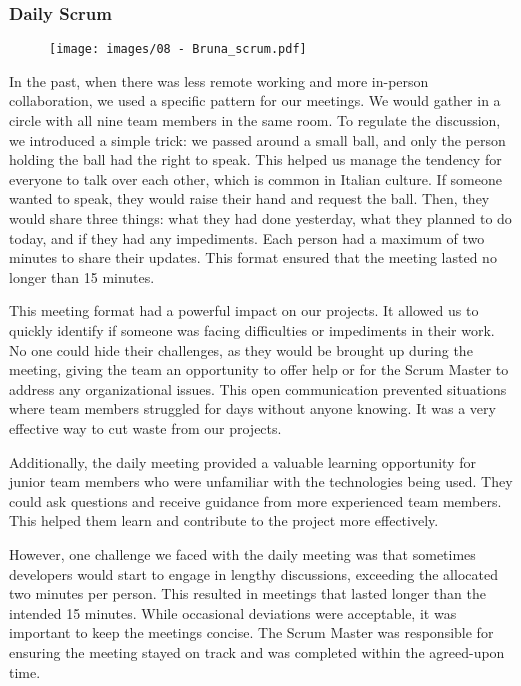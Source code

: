 \subsubsection{Daily Scrum}

\begin{figure}[!h]
  \centering
  \texttt{[image: images/08 - Bruna\_scrum.pdf]}
\end{figure}

In the past, when there was less remote working and more in-person
collaboration, we used a specific pattern for our meetings. We would
gather in a circle with all nine team members in the same room. To
regulate the discussion, we introduced a simple trick: we passed around
a small ball, and only the person holding the ball had the right to
speak. This helped us manage the tendency for everyone to talk over each
other, which is common in Italian culture. If someone wanted to speak,
they would raise their hand and request the ball. Then, they would share
three things: what they had done yesterday, what they planned to do
today, and if they had any impediments. Each person had a maximum of two
minutes to share their updates. This format ensured that the meeting
lasted no longer than 15 minutes.

This meeting format had a powerful impact on our projects. It allowed us
to quickly identify if someone was facing difficulties or impediments in
their work. No one could hide their challenges, as they would be brought
up during the meeting, giving the team an opportunity to offer help or
for the Scrum Master to address any organizational issues. This open
communication prevented situations where team members struggled for days
without anyone knowing. It was a very effective way to cut waste from
our projects.

Additionally, the daily meeting provided a valuable learning opportunity
for junior team members who were unfamiliar with the technologies being
used. They could ask questions and receive guidance from more
experienced team members. This helped them learn and contribute to the
project more effectively.

However, one challenge we faced with the daily meeting was that
sometimes developers would start to engage in lengthy discussions,
exceeding the allocated two minutes per person. This resulted in
meetings that lasted longer than the intended 15 minutes. While
occasional deviations were acceptable, it was important to keep the
meetings concise. The Scrum Master was responsible for ensuring the
meeting stayed on track and was completed within the agreed-upon time.

